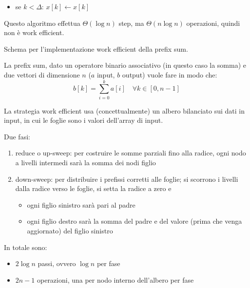 \begin{questions}
\begin{solution}
\begin{itemize}
\begin{itemize}
                \item se $k < \Delta$: $x[k] \leftarrow x[k]$
            \end{itemize}
        \end{itemize}
        
        Questo algoritmo effettua $\Theta (\log n)$ step, ma $\Theta (n \log n)$ operazioni, quindi non è work efficient.
    \end{solution}
    
    \question Schema per l'implementazione work efficient della prefix sum.
    
    \begin{solution}
        La prefix sum, dato un operatore binario associativo (in questo caso la somma) e due vettori di dimensione $n$ ($a$ input, $b$ output) vuole fare in modo che:
        $$ b[k] = \sum_{i = 0}^{k} a[i] \quad \forall k \in [0,n-1] $$
        
        La strategia work efficient usa (concettualmente) un albero bilanciato sui dati in input, in cui le foglie sono i valori dell'array di input.
        
        Due fasi: 
        \begin{enumerate}
            \item reduce o up-sweep: per costruire le somme parziali fino alla radice, ogni nodo a livelli intermedi sarà la somma dei nodi figlio
            
            \item down-sweep: per distribuire i prefissi corretti alle foglie; si scorrono i livelli dalla radice verso le foglie, si setta la radice a zero e
            \begin{itemize}
                \item ogni figlio sinistro sarà pari al padre
                
                \item ogni figlio destro sarà la somma del padre e del valore (prima che venga aggiornato) del figlio sinistro
            \end{itemize}
        \end{enumerate}
        
        In totale sono: 
        \begin{itemize}
            \item $2 \log n$ passi, ovvero $\log n$ per fase
            
            \item $2n - 1$ operazioni, una per nodo interno dell'albero per fase
        \end{itemize}
    \end{solution}
    

\end{questions}
